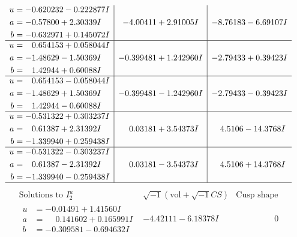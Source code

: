 \documentclass[1p]{elsarticle_modified}
\theoremstyle{definition}
\newcommand{\I}{\sqrt{-1}}
\begin{document}
$$\begin{array}{c|c|c}
\begin{aligned}
u &= -0.620232 - 0.222877 I \\
a &= -0.57800 + 2.30339 I \\
b &= -0.632971 + 0.145072 I\end{aligned}
 & -4.00411 + 2.91005 I & -8.76183 - 6.69107 I \\ \hline\begin{aligned}
u &= \phantom{-}0.654153 + 0.058044 I \\
a &= -1.48629 - 1.50369 I \\
b &= \phantom{-}1.42944 + 0.60088 I\end{aligned}
 & -0.399481 + 1.242960 I & -2.79433 + 0.39423 I \\ \hline\begin{aligned}
u &= \phantom{-}0.654153 - 0.058044 I \\
a &= -1.48629 + 1.50369 I \\
b &= \phantom{-}1.42944 - 0.60088 I\end{aligned}
 & -0.399481 - 1.242960 I & -2.79433 - 0.39423 I \\ \hline\begin{aligned}
u &= -0.531322 + 0.303237 I \\
a &= \phantom{-}0.61387 + 2.31392 I \\
b &= -1.339940 + 0.259438 I\end{aligned}
 & \phantom{-}0.03181 + 3.54373 I & \phantom{-}4.5106 - 14.3768 I \\ \hline\begin{aligned}
u &= -0.531322 - 0.303237 I \\
a &= \phantom{-}0.61387 - 2.31392 I \\
b &= -1.339940 - 0.259438 I\end{aligned}
 & \phantom{-}0.03181 - 3.54373 I & \phantom{-}4.5106 + 14.3768 I\\
 \hline 
 \end{array}$$\newpage$$\begin{array}{c|c|c}  
\text{Solutions to }I^u_{2}& \I (\text{vol} + \sqrt{-1}CS) & \text{Cusp shape}\\
 \hline 
\begin{aligned}
u &= -0.01491 + 1.41560 I \\
a &= \phantom{-}0.141602 + 0.165991 I \\
b &= -0.309581 - 0.694632 I\end{aligned}
 & -4.42111 - 6.18378 I & \phantom{-0.000000 } 0 \\ \hline\begin{aligned}

\end{aligned}
\end{array}$$
\end{document}
